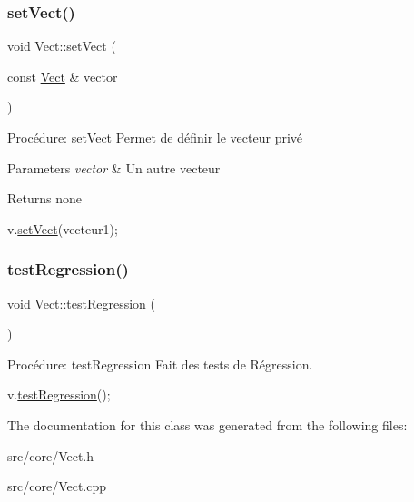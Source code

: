 \subsubsection{\texorpdfstring{set\+Vect()}{setVect()}}
{\footnotesize\ttfamily void Vect\+::set\+Vect (\begin{DoxyParamCaption}\item[{const \hyperlink{classVect}{Vect} \&}]{vector }\end{DoxyParamCaption})}



Procédure\+: set\+Vect Permet de définir le vecteur privé 


\begin{DoxyParams}{Parameters}
{\em vector} & Un autre vecteur \\
\hline
\end{DoxyParams}
\begin{DoxyReturn}{Returns}
none 
\begin{DoxyCode}
v.\hyperlink{classVect_a28408435bc900905d3416aef70140cd9}{setVect}(vecteur1);
\end{DoxyCode}
 
\end{DoxyReturn}
\mbox{\label{classVect_a734074001bba32f3d76e5cee612864f1}} 
\subsubsection{\texorpdfstring{test\+Regression()}{testRegression()}}
{\footnotesize\ttfamily void Vect\+::test\+Regression (\begin{DoxyParamCaption}{ }\end{DoxyParamCaption})}



Procédure\+: test\+Regression Fait des tests de Régression. 


\begin{DoxyCode}
v.\hyperlink{classVect_a734074001bba32f3d76e5cee612864f1}{testRegression}();
\end{DoxyCode}
 

The documentation for this class was generated from the following files\+:\begin{DoxyCompactItemize}
\item 
src/core/Vect.\+h\item 
src/core/Vect.\+cpp\end{DoxyCompactItemize}
